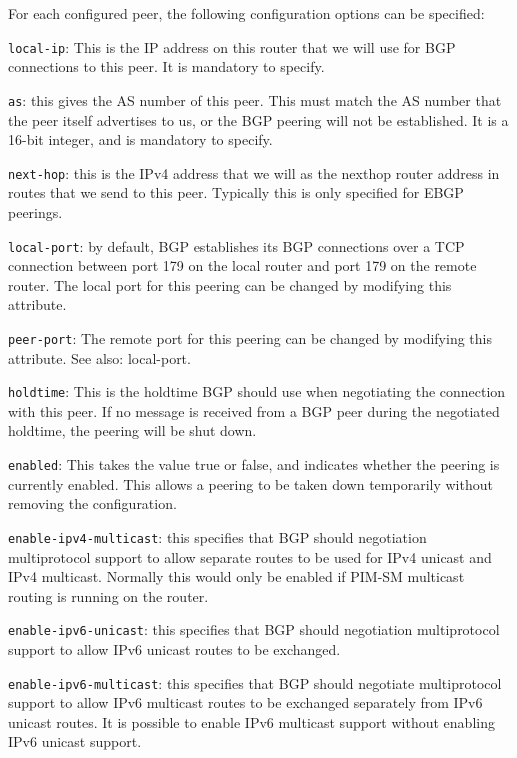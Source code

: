 \begin{description}
  For each configured {\stt peer}, the following
  configuration options can be specified:
\begin{description}
\item{\tt local-ip}: This is the IP address on this router that we
  will use for BGP connections to this peer.  It is mandatory to specify.
\item{\tt as}: this gives the AS number of this peer.  This must match
  the AS number that the peer itself advertises to us, or the BGP
  peering will not be established.  It is a 16-bit integer, and is
  mandatory to specify.
\item{\tt next-hop}: this is the IPv4 address that we will as the
  nexthop router address in routes that we send to this peer.
  Typically this is only specified for EBGP peerings.
\item{\tt local-port}: by default, BGP establishes its BGP connections
  over a TCP connection between port 179 on the local router and port
  179 on the remote router.  The local port for this peering can be
  changed by modifying this attribute.
\item{\tt peer-port}: The remote port for this peering can be
  changed by modifying this attribute. See also: {\stt local-port}.
\item{\tt holdtime}: This is the holdtime BGP should use when
  negotiating the connection with this peer.  If no message is
  received from a BGP peer during the negotiated holdtime, the
  peering will be shut down.
\item{\tt enabled}: This takes the value {\stt true} or {\stt false},
  and indicates whether the peering is currently enabled.  This allows
  a peering to be taken down temporarily without removing the
  configuration.
\item{\tt enable-ipv4-multicast}: this specifies that BGP should
  negotiation multiprotocol support to allow separate routes to be
  used for IPv4 unicast and IPv4 multicast.  Normally this would only
  be enabled if PIM-SM multicast routing is running on the router.
\item{\tt enable-ipv6-unicast}: this specifies that BGP should
  negotiation multiprotocol support to allow IPv6 unicast routes to be
  exchanged.
\item{\tt enable-ipv6-multicast}: this specifies that BGP should
  negotiate multiprotocol support to allow IPv6 multicast routes to be
  exchanged separately from IPv6 unicast routes.  It is possible to
  enable IPv6 multicast support without enabling IPv6 unicast support.

\end{description}
\end{description}
